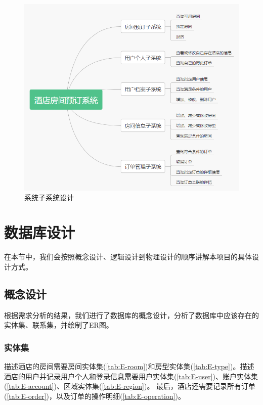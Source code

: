 \documentclass{myreport}
\begin{document}
\begin{figure}[htp]
    \centering
    \includegraphics[width=13cm]{figure/2018-12-22-10-31-35.png}
    \caption{系统子系统设计}
    \label{fig:sub-system-design}
\end{figure}


\chapter{数据库设计}
在本节中，我们会按照概念设计、逻辑设计到物理设计的顺序讲解本项目的具体设计方式。
\section{概念设计}

根据需求分析的结果，我们进行了数据库的概念设计，分析了数据库中应该存在的实体集、联系集，并绘制了ER图。

\subsection{实体集}



描述酒店的房间需要房间实体集(\autoref{tab:E-room})和房型实体集(\autoref{tab:E-type})。描述酒店的用户并记录用户个人和登录信息需要用户实体集(\autoref{tab:E-user})、账户实体集(\autoref{tab:E-account})、区域实体集(\autoref{tab:E-region})。
最后，酒店还需要记录所有订单(\autoref{tab:E-order})，以及订单的操作明细(\autoref{tab:E-operation})。\\
\end{document}
